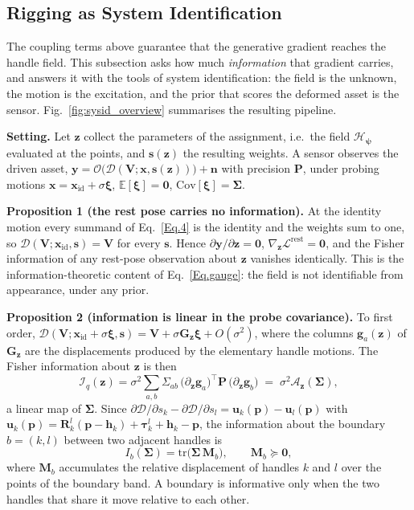 \documentclass[lettersize,journal]{IEEEtran}
\newenvironment{revblock}{\par\color{red}}{\par}
\begin{document}
\begin{revblock}
\subsection{Rigging as System Identification} \label{sec:sysid}
The coupling terms above guarantee that the generative gradient reaches the handle field. This
subsection asks how much \textit{information} that gradient carries, and answers it with the
tools of system identification: the field is the unknown, the motion is the excitation, and the
prior that scores the deformed asset is the sensor. Fig.~\ref{fig:sysid_overview} summarises the
resulting pipeline.

\textbf{Setting.} Let $\bm{z}$ collect the parameters of the assignment, i.e.\ the field
$\mathcal{H}_{\bm{\psi}}$ evaluated at the points, and $\bm{s}(\bm{z})$ the resulting weights. A
sensor observes the driven asset, $\bm{y}=\mathcal{O}\big(\mathcal{D}(\bm{V};\bm{x},\bm{s}(\bm{z}))\big)
+\bm{n}$ with precision $\bm{P}$, under probing motions
$\bm{x}=\bm{x}_{\text{id}}+\sigma\bm{\xi}$, $\mathbb{E}[\bm{\xi}]=\bm{0}$,
$\mathrm{Cov}[\bm{\xi}]=\bm{\Sigma}$.

\textbf{Proposition 1 (the rest pose carries no information).} At the identity motion every
summand of Eq.~\ref{Eq.4} is the identity and the weights sum to one, so
$\mathcal{D}(\bm{V};\bm{x}_{\text{id}},\bm{s})=\bm{V}$ for every $\bm{s}$. Hence
$\partial\bm{y}/\partial\bm{z}=\bm{0}$, $\nabla_{\bm{z}}\mathcal{L}^{\text{rest}}=\bm{0}$, and the
Fisher information of any rest-pose observation about $\bm{z}$ vanishes identically. This is the
information-theoretic content of Eq.~\ref{Eq.gauge}: the field is not identifiable from
appearance, under any prior.

\textbf{Proposition 2 (information is linear in the probe covariance).} To first order,
$\mathcal{D}(\bm{V};\bm{x}_{\text{id}}+\sigma\bm{\xi},\bm{s})=\bm{V}+\sigma\bm{G}_{\bm{z}}\bm{\xi}
+O(\sigma^{2})$, where the columns $\bm{g}_{a}(\bm{z})$ of $\bm{G}_{\bm{z}}$ are the displacements
produced by the elementary handle motions. The Fisher information about $\bm{z}$ is then
\begin{equation} \label{Eq.fisherlin}
\mathcal{I}_{q}(\bm{z})=\sigma^{2}\sum_{a,b}\Sigma_{ab}\,
\big(\partial_{\bm{z}}\bm{g}_{a}\big)^{\!\top}\bm{P}\,\big(\partial_{\bm{z}}\bm{g}_{b}\big)
\;=\;\sigma^{2}\mathcal{A}_{\bm{z}}(\bm{\Sigma}),
\end{equation}
a linear map of $\bm{\Sigma}$. Since $\partial\mathcal{D}/\partial s_{k}-\partial\mathcal{D}/
\partial s_{l}=\bm{u}_{k}(\bm{p})-\bm{u}_{l}(\bm{p})$ with
$\bm{u}_{k}(\bm{p})=\bm{R}^{l}_{k}(\bm{p}-\bm{h}_{k})+\bm{\tau}^{l}_{k}+\bm{h}_{k}-\bm{p}$, the
information about the boundary $b=(k,l)$ between two adjacent handles is
\begin{equation} \label{Eq.Ib}
I_{b}(\bm{\Sigma})=\mathrm{tr}\big(\bm{\Sigma}\,\bm{M}_{b}\big),\qquad \bm{M}_{b}\succeq\bm{0},
\end{equation}
where $\bm{M}_{b}$ accumulates the relative displacement of handles $k$ and $l$ over the
points of the boundary band. A boundary is informative only when the two handles that share it
move relative to each other.
\end{revblock}
\end{document}
